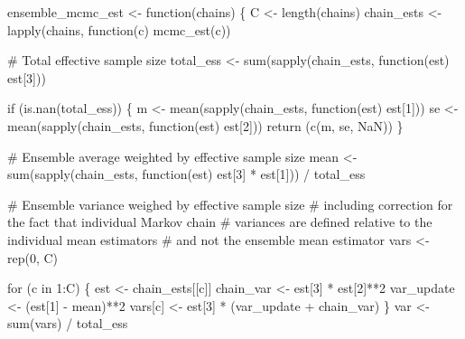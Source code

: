 \documentclass[
  letterpaper,
  DIV=11,
  numbers=noendperiod]{scrartcl}
\newenvironment{Shaded}{\begin{snugshade}}{\end{snugshade}}
\newcommand{\CommentTok}[1]{\textcolor[rgb]{0.37,0.37,0.37}{#1}}
\newcommand{\ConstantTok}[1]{\textcolor[rgb]{0.56,0.35,0.01}{#1}}
\newcommand{\ControlFlowTok}[1]{\textcolor[rgb]{0.00,0.23,0.31}{#1}}
\newcommand{\DecValTok}[1]{\textcolor[rgb]{0.68,0.00,0.00}{#1}}
\newcommand{\FunctionTok}[1]{\textcolor[rgb]{0.28,0.35,0.67}{#1}}
\newcommand{\NormalTok}[1]{\textcolor[rgb]{0.00,0.23,0.31}{#1}}
\newcommand{\OtherTok}[1]{\textcolor[rgb]{0.00,0.23,0.31}{#1}}
\newcommand{\SpecialCharTok}[1]{\textcolor[rgb]{0.37,0.37,0.37}{#1}}
\begin{document}
\begin{Shaded}
\begin{Highlighting}[]
\NormalTok{ensemble\_mcmc\_est }\OtherTok{\textless{}{-}} \ControlFlowTok{function}\NormalTok{(chains) \{}
\NormalTok{  C }\OtherTok{\textless{}{-}} \FunctionTok{length}\NormalTok{(chains)}
\NormalTok{  chain\_ests }\OtherTok{\textless{}{-}} \FunctionTok{lapply}\NormalTok{(chains, }\ControlFlowTok{function}\NormalTok{(c) }\FunctionTok{mcmc\_est}\NormalTok{(c))}

  \CommentTok{\# Total effective sample size}
\NormalTok{  total\_ess }\OtherTok{\textless{}{-}} \FunctionTok{sum}\NormalTok{(}\FunctionTok{sapply}\NormalTok{(chain\_ests, }\ControlFlowTok{function}\NormalTok{(est) est[}\DecValTok{3}\NormalTok{]))}

  \ControlFlowTok{if}\NormalTok{ (}\FunctionTok{is.nan}\NormalTok{(total\_ess)) \{}
\NormalTok{    m }\OtherTok{\textless{}{-}} \FunctionTok{mean}\NormalTok{(}\FunctionTok{sapply}\NormalTok{(chain\_ests, }\ControlFlowTok{function}\NormalTok{(est) est[}\DecValTok{1}\NormalTok{]))}
\NormalTok{    se }\OtherTok{\textless{}{-}} \FunctionTok{mean}\NormalTok{(}\FunctionTok{sapply}\NormalTok{(chain\_ests, }\ControlFlowTok{function}\NormalTok{(est) est[}\DecValTok{2}\NormalTok{]))}
    \FunctionTok{return}\NormalTok{ (}\FunctionTok{c}\NormalTok{(m, se, }\ConstantTok{NaN}\NormalTok{))}
\NormalTok{  \}}

  \CommentTok{\# Ensemble average weighted by effective sample size}
\NormalTok{  mean }\OtherTok{\textless{}{-}} \FunctionTok{sum}\NormalTok{(}\FunctionTok{sapply}\NormalTok{(chain\_ests,}
                     \ControlFlowTok{function}\NormalTok{(est) est[}\DecValTok{3}\NormalTok{] }\SpecialCharTok{*}\NormalTok{ est[}\DecValTok{1}\NormalTok{])) }\SpecialCharTok{/}\NormalTok{ total\_ess}

  \CommentTok{\# Ensemble variance weighed by effective sample size}
  \CommentTok{\# including correction for the fact that individual Markov chain}
  \CommentTok{\# variances are defined relative to the individual mean estimators}
  \CommentTok{\# and not the ensemble mean estimator}
\NormalTok{  vars }\OtherTok{\textless{}{-}} \FunctionTok{rep}\NormalTok{(}\DecValTok{0}\NormalTok{, C)}

  \ControlFlowTok{for}\NormalTok{ (c }\ControlFlowTok{in} \DecValTok{1}\SpecialCharTok{:}\NormalTok{C) \{}
\NormalTok{    est }\OtherTok{\textless{}{-}}\NormalTok{ chain\_ests[[c]]}
\NormalTok{    chain\_var }\OtherTok{\textless{}{-}}\NormalTok{ est[}\DecValTok{3}\NormalTok{] }\SpecialCharTok{*}\NormalTok{ est[}\DecValTok{2}\NormalTok{]}\SpecialCharTok{**}\DecValTok{2}
\NormalTok{    var\_update }\OtherTok{\textless{}{-}}\NormalTok{ (est[}\DecValTok{1}\NormalTok{] }\SpecialCharTok{{-}}\NormalTok{ mean)}\SpecialCharTok{**}\DecValTok{2}
\NormalTok{    vars[c] }\OtherTok{\textless{}{-}}\NormalTok{ est[}\DecValTok{3}\NormalTok{] }\SpecialCharTok{*}\NormalTok{ (var\_update }\SpecialCharTok{+}\NormalTok{ chain\_var)}
\NormalTok{  \}}
\NormalTok{  var }\OtherTok{\textless{}{-}} \FunctionTok{sum}\NormalTok{(vars) }\SpecialCharTok{/}\NormalTok{ total\_ess}


\end{Highlighting}
\end{Shaded}
\end{document}
